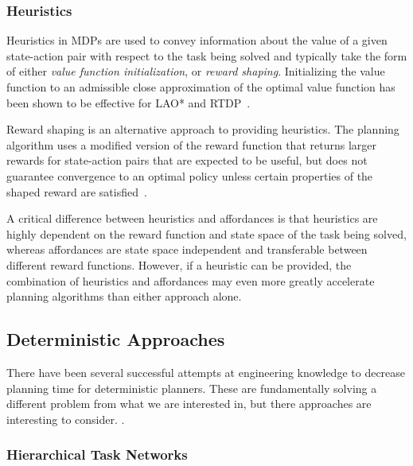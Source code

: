 \documentclass[conference]{IEEEtran}
\newcommand{\dnote}[1]{\textcolor{Green}{\textbf{}}}
\begin{document}
\subsubsection{Heuristics}
Heuristics in MDPs are used to convey information about the value of a given state-action pair with respect to the task being solved and typically take the form of either {\em value function initialization},
or {\em reward shaping}. Initializing the value function to an admissible close approximation of the optimal value function has been shown to be effective for LAO* and RTDP~\cite{Hansen:1999qf}.

Reward shaping is an alternative approach to providing heuristics. The planning algorithm uses a modified version of the reward function that returns larger rewards for state-action pairs that are expected to be useful, but does not guarantee convergence to an optimal policy unless certain properties of the shaped reward are satisfied~\cite{potshap}.

A critical difference between heuristics and affordances is that heuristics are highly dependent on the reward function and state space of the task being solved, whereas affordances are state space independent and transferable between different reward functions. However, if a heuristic can be provided, the combination of heuristics and affordances may even more greatly accelerate planning algorithms than either approach alone.

\subsection{Deterministic Approaches}

There have been several successful attempts at engineering knowledge to
decrease planning time for deterministic planners. These are fundamentally solving
a different problem from what we are interested in, but there approaches are interesting to consider.
\dnote{Need to rephrase this with justification for dealing with deterministic planners}.

\subsubsection{Hierarchical Task Networks}

\dnote{I think we should have a shoutout to Branavan's Learning High Level Plans from Text paper in this section (and include subgoal planning as part of this section}
\end{document}

